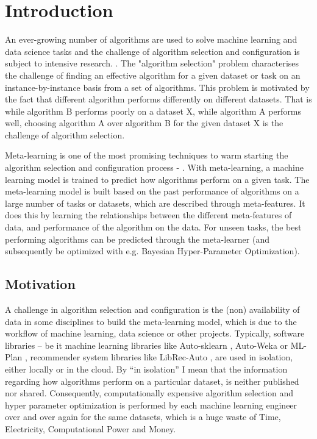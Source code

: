 \chapter{Introduction}
An ever-growing number of algorithms are used to solve machine learning and data science tasks and the challenge of algorithm selection and configuration is subject to intensive research.  \citep{bischl-et-al,brazdil:p,calandra-et-al,collins-et-al2018,romero-et-al,vartak-et-al}. The "algorithm selection" problem characterises the challenge of finding an effective algorithm for a given dataset or task on an instance-by-instance basis from a set of algorithms. This problem is motivated by the fact that different algorithm performs differently on different datasets. That is while algorithm B performs poorly on a dataset X, while algorithm A performs well, choosing algorithm A over algorithm B for the given dataset X is the challenge of algorithm selection.


Meta-learning is one of the most promising techniques to warm starting the algorithm selection and configuration process - \citep{hutter-et-al}. With meta-learning, a machine learning model is trained to predict how algorithms perform on a given task. The meta-learning model is built based on the past performance of algorithms on a large number of tasks or datasets, which are described through meta-features. It does this by learning the relationships between the different meta-features of data, and performance of the algorithm on the data. For unseen tasks, the best performing algorithms can be predicted through the meta-learner (and subsequently be optimized with e.g. Bayesian Hyper-Parameter Optimization).

\section{Motivation}
A challenge in algorithm selection and configuration is the (non) availability of data in some disciplines to build the meta-learning model, which is due to the workflow of machine learning, data science or other projects. Typically, software libraries – be it machine learning libraries like Auto-sklearn \citep{feurer:m}, Auto-Weka \citep{kotthoff:l} or ML-Plan \citep{mohr:f}, recommender system libraries like LibRec-Auto \citep{mansoury:m}, are used in isolation, either locally or in the cloud. By “in isolation” I mean that the information regarding how algorithms perform on a particular dataset, is neither published nor shared. Consequently, computationally expensive algorithm selection and hyper parameter optimization is performed by each machine learning engineer over and over again for the same datasets, which is a huge waste of Time, Electricity, Computational Power and Money.

